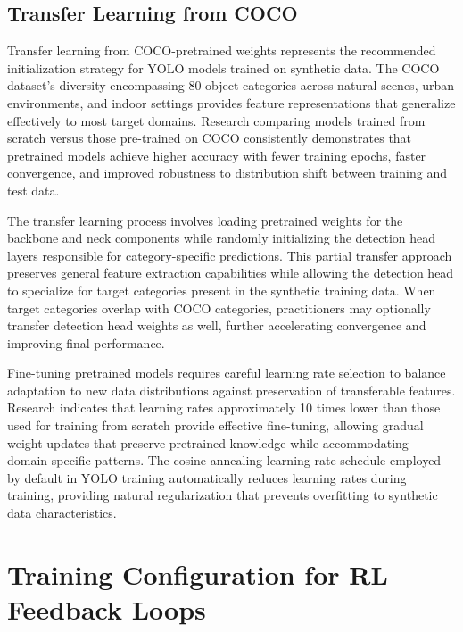 \subsection{Transfer Learning from COCO}

Transfer learning from COCO-pretrained weights represents the recommended initialization strategy for YOLO models trained on synthetic data. The COCO dataset's diversity encompassing 80 object categories across natural scenes, urban environments, and indoor settings provides feature representations that generalize effectively to most target domains. Research comparing models trained from scratch versus those pre-trained on COCO consistently demonstrates that pretrained models achieve higher accuracy with fewer training epochs, faster convergence, and improved robustness to distribution shift between training and test data.

The transfer learning process involves loading pretrained weights for the backbone and neck components while randomly initializing the detection head layers responsible for category-specific predictions. This partial transfer approach preserves general feature extraction capabilities while allowing the detection head to specialize for target categories present in the synthetic training data. When target categories overlap with COCO categories, practitioners may optionally transfer detection head weights as well, further accelerating convergence and improving final performance.

Fine-tuning pretrained models requires careful learning rate selection to balance adaptation to new data distributions against preservation of transferable features. Research indicates that learning rates approximately 10 times lower than those used for training from scratch provide effective fine-tuning, allowing gradual weight updates that preserve pretrained knowledge while accommodating domain-specific patterns. The cosine annealing learning rate schedule employed by default in YOLO training automatically reduces learning rates during training, providing natural regularization that prevents overfitting to synthetic data characteristics.

\section{Training Configuration for RL Feedback Loops}
\label{sec:training_config}

